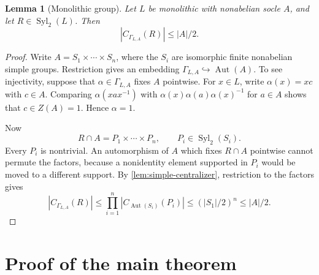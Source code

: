 \documentclass[11pt,reqno]{amsart}
\newtheorem{lemma}[theorem]{Lemma}
\theoremstyle{remark}
\DeclareMathOperator{\Aut}{Aut}
\DeclareMathOperator{\Syl}{Syl}
\newcommand{\GammaLA}{\Gamma_{L,A}}
\begin{document}
\begin{lemma}[Monolithic group]\label{lem:monolithic-centralizer}
Let $L$ be monolithic with nonabelian socle $A$, and let
$R\in\Syl_2(L)$.  Then
\begin{equation}\label{eq:monolithic-centralizer}
 |C_{\GammaLA}(R)|\leq |A|/2.
\end{equation}
\end{lemma}

\begin{proof}
Write
$A=S_1\times\cdots\times S_n$, where the $S_i$ are isomorphic finite
nonabelian simple groups.  Restriction gives an embedding
$\GammaLA\hookrightarrow\Aut(A)$.  To see injectivity, suppose that
$\alpha\in\GammaLA$ fixes $A$ pointwise.  For $x\in L$, write
$\alpha(x)=xc$ with $c\in A$.  Comparing $\alpha(xax^{-1})$ with
$\alpha(x)\alpha(a)\alpha(x)^{-1}$ for $a\in A$ shows that
$c\in Z(A)=1$.  Hence $\alpha=1$.

Now
\[
 R\cap A=P_1\times\cdots\times P_n,
 \qquad P_i\in\Syl_2(S_i).
\]
Every $P_i$ is nontrivial.  An automorphism of $A$ which fixes
$R\cap A$ pointwise cannot permute the factors, because a nonidentity
element supported in $P_i$ would be moved to a different support.  By
\cref{lem:simple-centralizer}, restriction to the factors gives
\[
 |C_{\GammaLA}(R)|
 \leq \prod_{i=1}^n |C_{\Aut(S_i)}(P_i)|
 \leq (|S_1|/2)^n
 \leq |A|/2.
\]
\end{proof}

\section{Proof of the main theorem}
\end{document}
